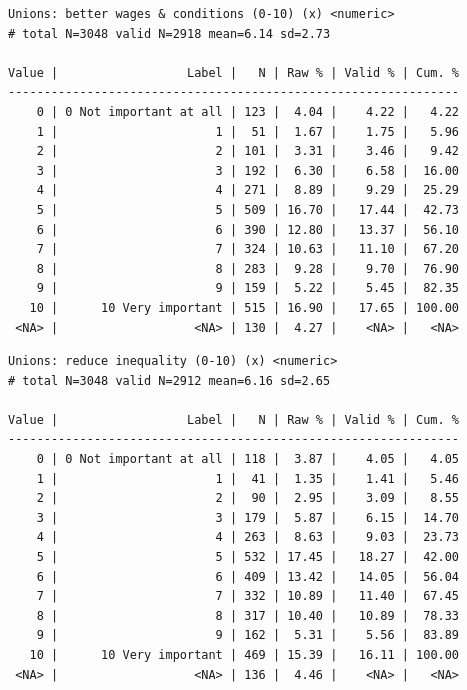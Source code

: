 \documentclass[
  letterpaper,
  DIV=11,
  numbers=noendperiod]{scrreprt}
\newenvironment{Shaded}{\begin{snugshade}}{\end{snugshade}}
\newcommand{\FunctionTok}[1]{\textcolor[rgb]{0.28,0.35,0.67}{#1}}
\newcommand{\NormalTok}[1]{\textcolor[rgb]{0.00,0.23,0.31}{#1}}
\newcommand{\SpecialCharTok}[1]{\textcolor[rgb]{0.37,0.37,0.37}{#1}}
\begin{document}
\begin{verbatim}
Unions: better wages & conditions (0-10) (x) <numeric> 
# total N=3048 valid N=2918 mean=6.14 sd=2.73

Value |                  Label |   N | Raw % | Valid % | Cum. %
---------------------------------------------------------------
    0 | 0 Not important at all | 123 |  4.04 |    4.22 |   4.22
    1 |                      1 |  51 |  1.67 |    1.75 |   5.96
    2 |                      2 | 101 |  3.31 |    3.46 |   9.42
    3 |                      3 | 192 |  6.30 |    6.58 |  16.00
    4 |                      4 | 271 |  8.89 |    9.29 |  25.29
    5 |                      5 | 509 | 16.70 |   17.44 |  42.73
    6 |                      6 | 390 | 12.80 |   13.37 |  56.10
    7 |                      7 | 324 | 10.63 |   11.10 |  67.20
    8 |                      8 | 283 |  9.28 |    9.70 |  76.90
    9 |                      9 | 159 |  5.22 |    5.45 |  82.35
   10 |      10 Very important | 515 | 16.90 |   17.65 | 100.00
 <NA> |                   <NA> | 130 |  4.27 |    <NA> |   <NA>
\end{verbatim}

\begin{Shaded}
\end{Shaded}

\begin{verbatim}
Unions: reduce inequality (0-10) (x) <numeric> 
# total N=3048 valid N=2912 mean=6.16 sd=2.65

Value |                  Label |   N | Raw % | Valid % | Cum. %
---------------------------------------------------------------
    0 | 0 Not important at all | 118 |  3.87 |    4.05 |   4.05
    1 |                      1 |  41 |  1.35 |    1.41 |   5.46
    2 |                      2 |  90 |  2.95 |    3.09 |   8.55
    3 |                      3 | 179 |  5.87 |    6.15 |  14.70
    4 |                      4 | 263 |  8.63 |    9.03 |  23.73
    5 |                      5 | 532 | 17.45 |   18.27 |  42.00
    6 |                      6 | 409 | 13.42 |   14.05 |  56.04
    7 |                      7 | 332 | 10.89 |   11.40 |  67.45
    8 |                      8 | 317 | 10.40 |   10.89 |  78.33
    9 |                      9 | 162 |  5.31 |    5.56 |  83.89
   10 |      10 Very important | 469 | 15.39 |   16.11 | 100.00
 <NA> |                   <NA> | 136 |  4.46 |    <NA> |   <NA>
\end{verbatim}
\end{document}
